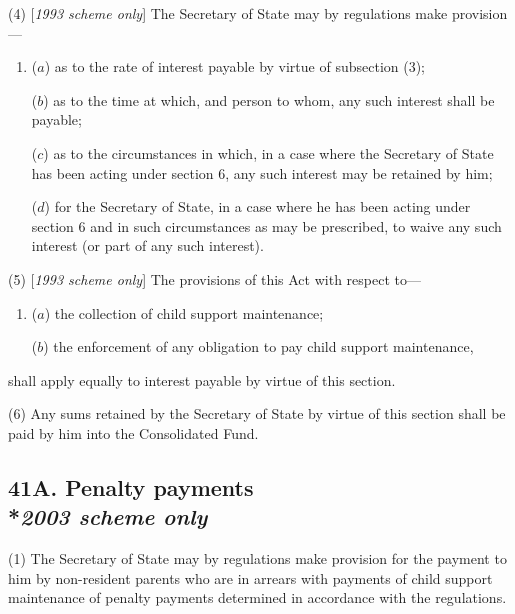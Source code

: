 \documentclass[12pt,a4paper]{article}
\begin{document}
(4) [\emph{1993 scheme only}] The Secretary of State may by regulations make provision—
\begin{enumerate}\item[]
($a$) as to the rate of interest payable by virtue of subsection (3);

($b$) as to the time at which, and person to whom, any such interest shall be payable;

($c$) as to the circumstances in which, in a case where the Secretary of State has been acting under section 6, any such interest may be retained by him;

($d$) for the Secretary of State, in a case where he has been acting under section 6 and in such circumstances as may be prescribed, to waive any such interest (or part of any such interest).
\end{enumerate}

(5) [\emph{1993 scheme only}] The provisions of this Act with respect to—
\begin{enumerate}\item[]
($a$) the collection of child support maintenance;

($b$) the enforcement of any obligation to pay child support maintenance,
\end{enumerate}
shall apply equally to interest payable by virtue of this section.

(6) Any sums retained by the Secretary of State by virtue of this section shall be paid by him into the Consolidated Fund.


\subsection[41A. Penalty payments --- \emph{2003 scheme only}]{41A. Penalty payments\\*\emph{2003 scheme only}}

(1) The Secretary of State may by regulations make provision for the payment to him by non-resident parents who are in arrears with payments of child support maintenance of penalty payments determined in accordance with the regulations.
\end{document}

